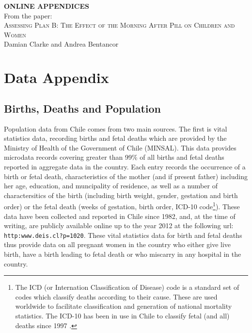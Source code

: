 \documentclass[11pt,subeqn]{article}
\begin{document}
\begin{spacing}{1.4}

\begin{center}
\textbf{ONLINE APPENDICES} \\
\vspace{4mm}
From the paper: \\
\vspace{6mm}
{\large \textsc{Assessing Plan B: 
The Effect of the Morning After Pill on Children and Women}} \\
Damian Clarke and Andrea Bentancor
\end{center}

\tableofcontents


\setlength\parindent{0.25in}
\setlength\parskip{0.25in}


\newpage
\section{Data Appendix}
\subsection{Births, Deaths and Population}
Population data from Chile comes from two main sources.  The first is vital 
statistics data, recording births and fetal deaths which are provided by the 
Ministry of Health of the Government of Chile (MINSAL).  This data provides 
microdata records covering greater than 99\% of all births and fetal deaths 
reported in aggregate data \citep{Bharadwajetal2013} in the country.  Each 
entry records the occurrence of a birth or fetal death, characteristics of the 
mother (and if present father) including her age, education, and muncipality of 
residence, as well as a number of charactersitics of the birth (including birth 
weight, gender, gestation and birth order) or the fetal death (weeks of 
gestation, birth order, ICD-10 code\footnote{The ICD (or Internation 
Classification of Disease) code is a standard set of codes which classify deaths 
according to their cause. These are used worldwide to facilitate classification 
and generation of national mortality statistics. The ICD-10 has been in use in
Chile to classify fetal (and all) deaths since 1997 \citep{INE2014}.}). These 
data have been collected and reported in Chile since 1982, and, at the time of 
writing, are publicly available online up to the year 2012 at the following url: 
\texttt{http:\/\/www.deis.cl\/?p=1020}.  These vital statistics data for birth 
and fetal deaths thus provide data on all pregnant women in the country who 
either give live birth, have a birth leading to fetal death or who miscarry in 
any hospital in the country. 


\end{spacing}
\end{document}
